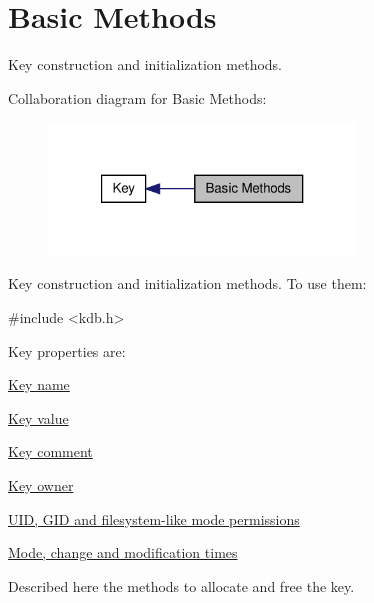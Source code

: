 \hypertarget{group__key__basic}{\section{Basic Methods}
\label{group__key__basic}
}


Key construction and initialization methods.  


Collaboration diagram for Basic Methods\-:
\nopagebreak
\begin{figure}[H]
\begin{center}
\leavevmode
\includegraphics[width=232pt]{group__key__basic}
\end{center}
\end{figure}
Key construction and initialization methods. To use them\-: 
\begin{DoxyCode}
\textcolor{preprocessor}{#include <kdb.h>}
\end{DoxyCode}


Key properties are\-:
\begin{DoxyItemize}
\item \hyperlink{group__keyname}{Key name }
\item \hyperlink{group__keyvalue}{Key value }
\item \hyperlink{group__keyvalue_gafb89735689929ff717cc9f2d0d0b46a2}{Key comment }
\item \hyperlink{group__keyname_ga35922a017bee8b4bcb493bbdfad9d6f5}{Key owner }
\item \hyperlink{group__keymeta}{U\-I\-D, G\-I\-D and filesystem-\/like mode permissions }
\item \hyperlink{group__keymeta}{Mode, change and modification times }
\end{DoxyItemize}

Described here the methods to allocate and free the key. 